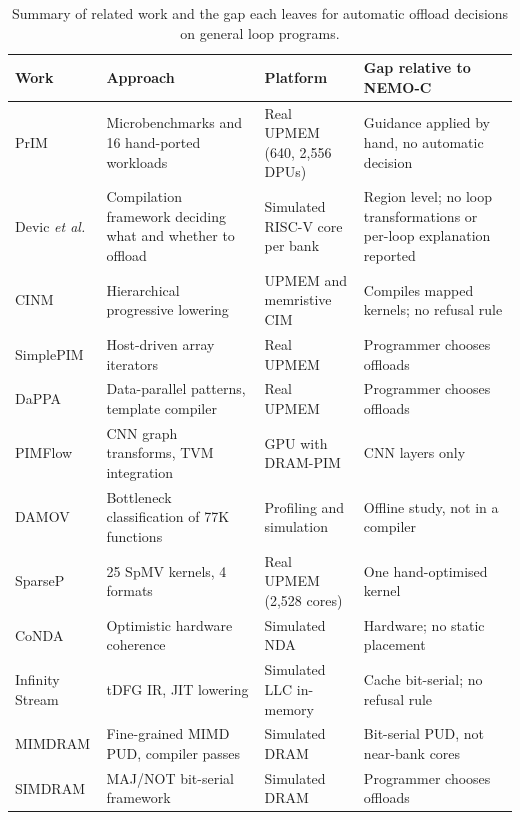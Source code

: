 \documentclass{ieeeaccess}
\begin{document}
\begin{table}[!t]
\caption{Summary of related work and the gap each leaves for automatic offload decisions on general loop programs.}
\label{tab:related}
\setlength{\tabcolsep}{4pt}
\renewcommand{\arraystretch}{1.12}
\centering
\begin{tabular}{|p{2.6cm}|p{4.2cm}|p{3.2cm}|p{6.6cm}|}
\hline
\textbf{Work} & \textbf{Approach} & \textbf{Platform} & \textbf{Gap relative to NEMO-C} \\ \hline
PrIM \cite{gomezluna2022prim} & Microbenchmarks and 16 hand-ported workloads & Real UPMEM (640, 2,556 DPUs) & Guidance applied by hand, no automatic decision \\ \hline
Devic \emph{et al.} \cite{devic2022topim} & Compilation framework deciding what and whether to offload & Simulated RISC-V core per bank & Region level; no loop transformations or per-loop explanation reported \\ \hline
CINM \cite{khan2023cinm} & Hierarchical progressive lowering & UPMEM and memristive CIM & Compiles mapped kernels; no refusal rule \\ \hline
SimplePIM \cite{chen2023simplepim} & Host-driven array iterators & Real UPMEM & Programmer chooses offloads \\ \hline
DaPPA \cite{oliveira2023dappa} & Data-parallel patterns, template compiler & Real UPMEM & Programmer chooses offloads \\ \hline
PIMFlow \cite{shin2023pimflow} & CNN graph transforms, TVM integration & GPU with DRAM-PIM & CNN layers only \\ \hline
DAMOV \cite{oliveira2021damov} & Bottleneck classification of 77K functions & Profiling and simulation & Offline study, not in a compiler \\ \hline
SparseP \cite{giannoula2022sparsep} & 25 SpMV kernels, 4 formats & Real UPMEM (2,528 cores) & One hand-optimised kernel \\ \hline
CoNDA \cite{boroumand2019conda} & Optimistic hardware coherence & Simulated NDA & Hardware; no static placement \\ \hline
Infinity Stream \cite{wang2023infinity} & tDFG IR, JIT lowering & Simulated LLC in-memory & Cache bit-serial; no refusal rule \\ \hline
MIMDRAM \cite{oliveira2024mimdram} & Fine-grained MIMD PUD, compiler passes & Simulated DRAM & Bit-serial PUD, not near-bank cores \\ \hline
SIMDRAM \cite{hajinazar2021simdram} & MAJ/NOT bit-serial framework & Simulated DRAM & Programmer chooses offloads \\ \hline

\end{tabular}
\end{table}
\end{document}
